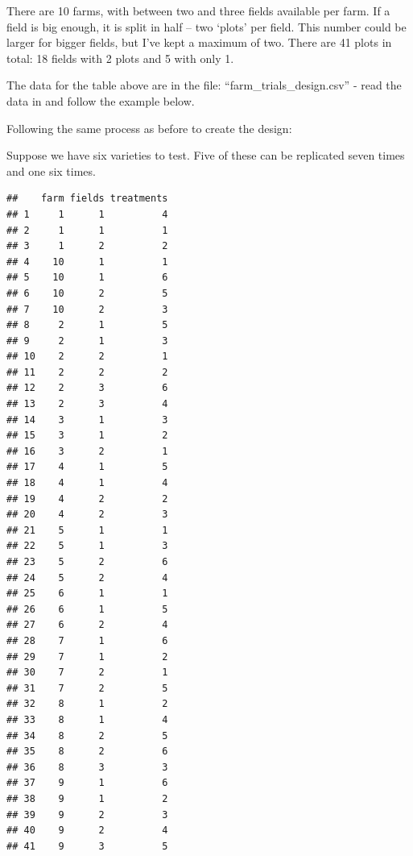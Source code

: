 \documentclass[
]{book}
\newenvironment{Shaded}{\begin{snugshade}}{\end{snugshade}}
\newcommand{\AttributeTok}[1]{\textcolor[rgb]{0.77,0.63,0.00}{#1}}
\newcommand{\DecValTok}[1]{\textcolor[rgb]{0.00,0.00,0.81}{#1}}
\newcommand{\FunctionTok}[1]{\textcolor[rgb]{0.00,0.00,0.00}{#1}}
\newcommand{\NormalTok}[1]{#1}
\newcommand{\OtherTok}[1]{\textcolor[rgb]{0.56,0.35,0.01}{#1}}
\newcommand{\SpecialCharTok}[1]{\textcolor[rgb]{0.00,0.00,0.00}{#1}}
\begin{document}
There are 10 farms, with between two and three fields available per farm. If a field is big enough, it is split in half -- two `plots' per field. This number could be larger for bigger fields, but I've kept a maximum of two. There are 41 plots in total: 18 fields with 2 plots and 5 with only 1.

The data for the table above are in the file: ``farm\_trials\_design.csv'' - read the data in and follow the example below.

Following the same process as before to create the design:

Suppose we have six varieties to test. Five of these can be replicated seven times and one six times.

\begin{Shaded}
\end{Shaded}

\begin{verbatim}
##    farm fields treatments
## 1     1      1          4
## 2     1      1          1
## 3     1      2          2
## 4    10      1          1
## 5    10      1          6
## 6    10      2          5
## 7    10      2          3
## 8     2      1          5
## 9     2      1          3
## 10    2      2          1
## 11    2      2          2
## 12    2      3          6
## 13    2      3          4
## 14    3      1          3
## 15    3      1          2
## 16    3      2          1
## 17    4      1          5
## 18    4      1          4
## 19    4      2          2
## 20    4      2          3
## 21    5      1          1
## 22    5      1          3
## 23    5      2          6
## 24    5      2          4
## 25    6      1          1
## 26    6      1          5
## 27    6      2          4
## 28    7      1          6
## 29    7      1          2
## 30    7      2          1
## 31    7      2          5
## 32    8      1          2
## 33    8      1          4
## 34    8      2          5
## 35    8      2          6
## 36    8      3          3
## 37    9      1          6
## 38    9      1          2
## 39    9      2          3
## 40    9      2          4
## 41    9      3          5
\end{verbatim}
\end{document}
